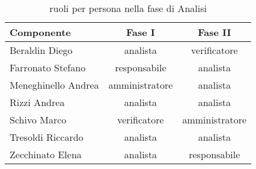 \begin{table}[h!]
\centering
\begin{tabular}{|l|c|c|}
\hline
Componente& Fase I&Fase II\\
\hline
Beraldin Diego & analista&verificatore\\
Farronato Stefano & responsabile&analista\\
Meneghinello Andrea & amministratore&analista\\
Rizzi Andrea &  analista&analista\\
Schivo Marco & verificatore&amministratore\\
Tresoldi Riccardo & analista&analista\\
Zecchinato Elena & analista&responsabile\\
\hline
\end{tabular}
\caption{ruoli per persona nella fase di Analisi}\label{tab:ruolian3}
\end{table}


\clearpage
